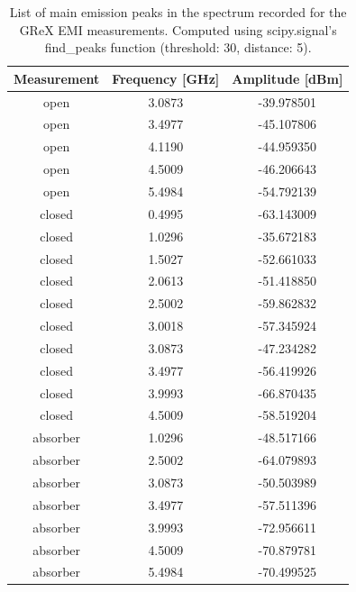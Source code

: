 \documentclass[12pt,a4paper,oneside]{article}
\begin{document}
\begin{table}[]
    \centering
   
    \begin{tabular}{|c|c|c|}
    \hline
         \cellcolor[gray]{0.85} Measurement & \cellcolor[gray]{0.85} Frequency [GHz] &  \cellcolor[gray]{0.85} Amplitude [dBm]\\ \hline
         open & 3.0873 & -39.978501 \\ \hline
         open & 3.4977 & -45.107806 \\ \hline
         open & 4.1190 & -44.959350 \\ \hline
         open & 4.5009 & -46.206643 \\ \hline
         open & 5.4984 & -54.792139 \\ \hline
         \hline
         closed & 0.4995 & -63.143009 \\ \hline
         closed & 1.0296 & -35.672183 \\ \hline
         closed & 1.5027 & -52.661033 \\ \hline
         closed & 2.0613 & -51.418850 \\ \hline
         closed & 2.5002 & -59.862832 \\ \hline
         closed & 3.0018 & -57.345924 \\ \hline
         closed & 3.0873 & -47.234282 \\ \hline
         closed & 3.4977 & -56.419926 \\ \hline
         closed & 3.9993 & -66.870435 \\ \hline
         closed & 4.5009 & -58.519204 \\ \hline
         \hline
         absorber & 1.0296 & -48.517166 \\ \hline
         absorber & 2.5002 & -64.079893 \\ \hline
         absorber & 3.0873 & -50.503989 \\ \hline
         absorber & 3.4977 & -57.511396 \\ \hline
         absorber & 3.9993 & -72.956611 \\ \hline
         absorber & 4.5009 & -70.879781 \\ \hline
         absorber & 5.4984 & -70.499525 \\ \hline

    \end{tabular}
    \caption{List of main emission peaks in the spectrum recorded for the GReX EMI measurements. Computed using scipy.signal's find\_peaks function (threshold: 30, distance: 5).}
    \label{tab:main_emission_peaks}
\end{table}
\end{document}
